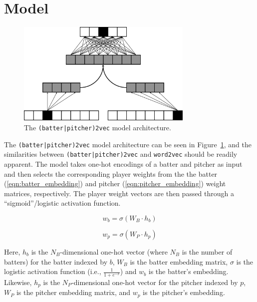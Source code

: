 \documentclass{article}
\begin{document}
\section{Model}
\label{model}

\begin{figure}[h]
\centering
\includegraphics[width=0.75\textwidth,height=\textheight,keepaspectratio]{batter_pitcher_model.png}
\caption{The \texttt{(batter|pitcher)2vec} model architecture.}
\label{fig:batter_pitcher}
\end{figure}

The \texttt{(batter|pitcher)2vec} model architecture can be seen in Figure~\ref{fig:batter_pitcher}, and the similarities between \texttt{(batter|pitcher)2vec} and \texttt{word2vec} should be readily apparent. The model takes one-hot encodings of a batter and pitcher as input and then selects the corresponding player weights from the the batter (\ref{eqn:batter_embedding}) and pitcher (\ref{eqn:pitcher_embedding}) weight matrices, respectively. The player weight vectors are then passed through a ``sigmoid''/logistic activation function.

\begin{equation}
\label{eqn:batter_embedding}
w_b = \sigma(W_B \cdot h_b)
\end{equation}

\begin{equation}
\label{eqn:pitcher_embedding}
w_p = \sigma(W_P \cdot h_p)
\end{equation}

Here, $h_b$ is the $N_B$-dimensional one-hot vector (where $N_B$ is the number of batters) for the batter indexed by $b$, $W_B$ is the batter embedding matrix, $\sigma$ is the logistic activation function (i.e., $\frac{1}{1 + e^{-x}}$) and $w_b$ is the batter's embedding. Likewise, $h_p$ is the $N_P$-dimensional one-hot vector for the pitcher indexed by $p$, $W_P$ is the pitcher embedding matrix, and $w_p$ is the pitcher's embedding.
\end{document}

